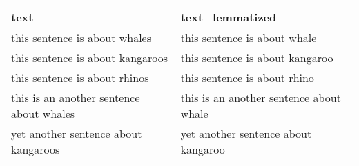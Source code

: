 \begin{tabular}{ll}
\toprule
                                     text &                          text\_lemmatized \\
\midrule
            this sentence is about whales &             this sentence is about whale \\
         this sentence is about kangaroos &          this sentence is about kangaroo \\
            this sentence is about rhinos &             this sentence is about rhino \\
 this is an another sentence about whales &  this is an another sentence about whale \\
     yet another sentence about kangaroos &      yet another sentence about kangaroo \\
\bottomrule
\end{tabular}
